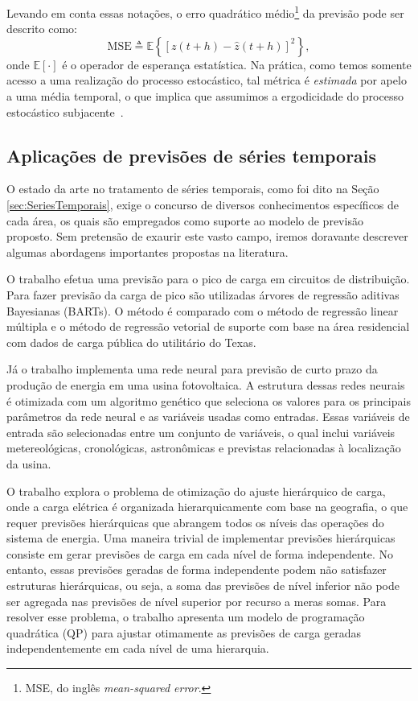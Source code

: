 Levando em conta essas notações, o erro quadrático médio\footnote{MSE, do inglês \emph{mean-squared error}.} da previsão pode ser descrito como:
\begin{equation}
\text{MSE} \triangleq \mathbb{E}\left\{\left[z(t + h) - \hat{z}(t+h)\right]^2\right\},
\end{equation}
onde $\mathbb{E}[\cdot]$ é o operador de esperança estatística. Na prática, como temos somente acesso a uma realização do processo estocástico, tal métrica é \emph{estimada} por apelo a uma média temporal, o que implica que assumimos a ergodicidade do processo estocástico subjacente~\cite{LonnieRandomProcesses2003}.

\subsection{Aplicações de previsões de séries temporais}
O estado da arte no tratamento de séries temporais, como foi dito na Seção \ref{sec:SeriesTemporais}, exige o concurso de diversos conhecimentos específicos de cada área, os quais são empregados como suporte ao modelo de previsão proposto. Sem pretensão de exaurir este vasto campo, iremos doravante descrever algumas abordagens importantes propostas na literatura.

O trabalho \cite{8412670} efetua uma previsão para o pico de carga em circuitos de distribuição. Para fazer previsão da carga de pico são utilizadas árvores de regressão aditivas Bayesianas (BARTs). O método é comparado com o método de regressão linear múltipla e o método de regressão vetorial de suporte com base na área residencial com dados de carga pública do utilitário do Texas.

Já o trabalho \cite{8412036} implementa uma rede neural para previsão de curto prazo da produção de energia em uma usina fotovoltaica. A estrutura dessas redes neurais é otimizada com um algoritmo genético que seleciona os valores para os principais parâmetros da rede neural e as variáveis usadas como entradas. Essas variáveis de entrada são selecionadas entre um conjunto de variáveis, o qual inclui variáveis metereológicas, cronológicas, astronômicas e previstas relacionadas à localização da usina.

O trabalho \cite{8413116} explora o problema de otimização do ajuste hierárquico de carga, onde a carga elétrica é organizada hierarquicamente com base na geografia, o que requer previsões hierárquicas que abrangem todos os níveis das operações do sistema de energia. Uma maneira trivial de implementar previsões hierárquicas consiste em gerar previsões de carga em cada nível de forma independente. No entanto, essas previsões geradas de forma independente podem não satisfazer estruturas hierárquicas, ou seja, a soma das previsões de nível inferior não pode ser agregada nas previsões de nível superior por recurso a meras somas. Para resolver esse problema, o trabalho \cite{8413116} apresenta um modelo de programação quadrática (QP) para ajustar otimamente as previsões de carga geradas independentemente em cada nível de uma hierarquia.

